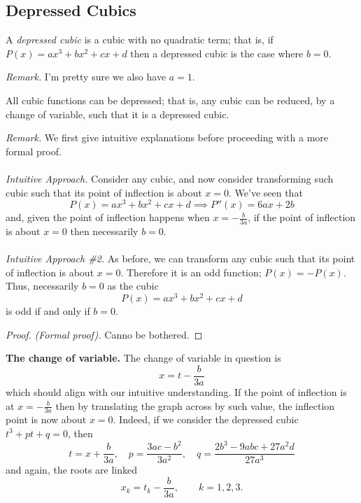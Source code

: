 \documentclass[12pt]{article}
\begin{document}
\subsection{Depressed Cubics}
\begin{dfn}
A \textit{depressed cubic} is a cubic with no quadratic term; that is, if $P(x) = ax^3 
+ bx^2 + cx + d$ then a depressed cubic is the case where $b = 0$.
\end{dfn}
\textit{Remark.} I'm pretty sure we also have $a = 1$.
\begin{thm}
All cubic functions can be depressed; that is, any cubic can be reduced, by a change of variable, such that it is a depressed cubic.
\end{thm}
\textit{Remark.} We first give intuitive explanations before proceeding with a more formal proof.\\\\
\textit{Intuitive Approach.} Consider any cubic, and now consider transforming such cubic such that its point of inflection is about $x = 0$. We've seen that
\begin{equation*}
    P(x) = ax^3 + bx^2 + cx + d \implies P''(x) = 6ax + 2b
\end{equation*}
and, given the point of inflection happens when $x = -\frac{b}{3a}$, if the point of inflection is about $x = 0$ then necessarily $b = 0$.\\\\
\textit{Intuitive Approach \#2.} As before, we can transform any cubic such that its point of inflection is about $x = 0$. Therefore it is an odd function; $P(x) = -P(x)$. Thus, necessarily $b = 0$ as the cubic
\begin{equation*}
    P(x) = ax^3 + bx^2 + cx + d
\end{equation*}
is odd if and only if $b = 0$.
\begin{proof}
    \textit{(Formal proof).} Canno be bothered.
\end{proof}

\noindent \textbf{The change of variable.} The change of variable in question is
\begin{equation*}
    x = t - \frac{b}{3a}
\end{equation*}
which should align with our intuitive understanding. If the point of inflection is at $x = -\frac{b}{3a}$ then by translating the graph across by such value, the inflection point is now about $x = 0$. Indeed, if we consider the depressed cubic $t^3 + pt + q = 0$, then
\begin{equation*}
    t = x + \frac{b}{3a}, \quad p =\frac{3ac - b^2}{3a^2}, \quad q = \frac{2b^3 - 9abc + 27a^2d}{27a^3}
\end{equation*}
and again, the roots are linked
\begin{equation*}
    x_k = t_k - \frac{b}{3a},\qquad k = 1,2,3.
\end{equation*}
\end{document}
